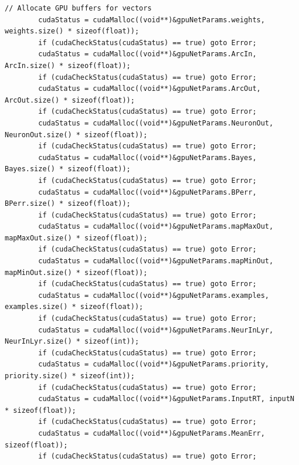 \documentclass[10pt,a4paper]{article}
\begin{document}
\begin{lstlisting}[style=mycuda, caption= classe di interfaccia alla GPU, captionpos=b]
		// Allocate GPU buffers for vectors    
		cudaStatus = cudaMalloc((void**)&gpuNetParams.weights, weights.size() * sizeof(float));
		if (cudaCheckStatus(cudaStatus) == true) goto Error;
		cudaStatus = cudaMalloc((void**)&gpuNetParams.ArcIn, ArcIn.size() * sizeof(float));
		if (cudaCheckStatus(cudaStatus) == true) goto Error;
		cudaStatus = cudaMalloc((void**)&gpuNetParams.ArcOut, ArcOut.size() * sizeof(float));
		if (cudaCheckStatus(cudaStatus) == true) goto Error;
		cudaStatus = cudaMalloc((void**)&gpuNetParams.NeuronOut, NeuronOut.size() * sizeof(float));
		if (cudaCheckStatus(cudaStatus) == true) goto Error;
		cudaStatus = cudaMalloc((void**)&gpuNetParams.Bayes, Bayes.size() * sizeof(float));
		if (cudaCheckStatus(cudaStatus) == true) goto Error;
		cudaStatus = cudaMalloc((void**)&gpuNetParams.BPerr, BPerr.size() * sizeof(float));
		if (cudaCheckStatus(cudaStatus) == true) goto Error;
		cudaStatus = cudaMalloc((void**)&gpuNetParams.mapMaxOut, mapMaxOut.size() * sizeof(float));
		if (cudaCheckStatus(cudaStatus) == true) goto Error;
		cudaStatus = cudaMalloc((void**)&gpuNetParams.mapMinOut, mapMinOut.size() * sizeof(float));
		if (cudaCheckStatus(cudaStatus) == true) goto Error;
		cudaStatus = cudaMalloc((void**)&gpuNetParams.examples, examples.size() * sizeof(float));
		if (cudaCheckStatus(cudaStatus) == true) goto Error;
		cudaStatus = cudaMalloc((void**)&gpuNetParams.NeurInLyr, NeurInLyr.size() * sizeof(int));
		if (cudaCheckStatus(cudaStatus) == true) goto Error;
		cudaStatus = cudaMalloc((void**)&gpuNetParams.priority, priority.size() * sizeof(int));
		if (cudaCheckStatus(cudaStatus) == true) goto Error;
		cudaStatus = cudaMalloc((void**)&gpuNetParams.InputRT, inputN * sizeof(float));
		if (cudaCheckStatus(cudaStatus) == true) goto Error;
		cudaStatus = cudaMalloc((void**)&gpuNetParams.MeanErr, sizeof(float));
		if (cudaCheckStatus(cudaStatus) == true) goto Error;



\end{lstlisting}
\end{document}

